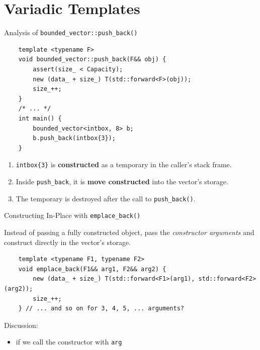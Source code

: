 \section{Variadic Templates}

\begin{frame}[fragile]{Analysis of \texttt{bounded\_vector::push\_back()}}
  \begin{verbatim}
    template <typename F>
    void bounded_vector::push_back(F&& obj) {
        assert(size_ < Capacity);
        new (data_ + size_) T(std::forward<F>(obj));
        size_++;
    }
    /* ... */
    int main() {
        bounded_vector<intbox, 8> b;
        b.push_back(intbox{3});
    }
  \end{verbatim}

  \begin{enumerate}
    \item \texttt{intbox\{3\}} is \textbf{constructed} as a temporary in the caller's stack frame.
    \item Inside \verb|push_back|, it is \textbf{move constructed} into the vector's storage.
    \item The temporary is destroyed after the call to \verb|push_back()|.
  \end{enumerate}
\end{frame}

\begin{frame}[fragile]{Constructing In-Place with \texttt{emplace\_back()}}
  \begin{sqt:tip}
    Instead of passing a fully constructed object, pass the \emph{constructor arguments}
    and construct directly in the vector's storage.
  \end{sqt:tip}

  \begin{verbatim}
    template <typename F1, typename F2>
    void emplace_back(F1&& arg1, F2&& arg2) {
        new (data_ + size_) T(std::forward<F1>(arg1), std::forward<F2>(arg2));
        size_++;
    } // ... and so on for 3, 4, 5, ... arguments?
  \end{verbatim}

  \textcolor{sqt-question}{
    Discussion:\\
    \begin{itemize}
      \item if we call the constructor with \texttt{arg}
    \end{itemize}
  }

\end{frame}

